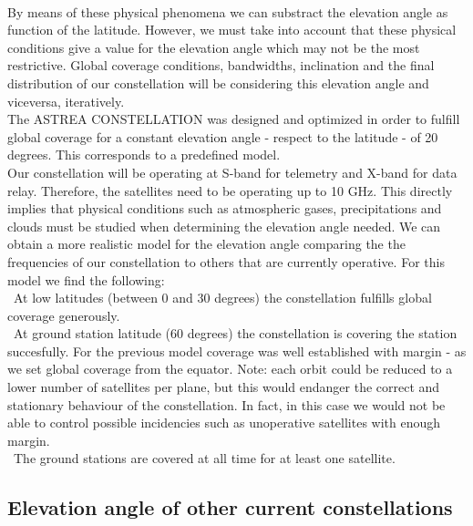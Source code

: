 \paragraph{}

By means of these physical phenomena we can substract the elevation angle as function of the latitude. However, we must take into account that these physical conditions give a value for the elevation angle which may not be the most restrictive. Global coverage conditions, bandwidths, inclination and the final distribution of our constellation will be considering this elevation angle and viceversa, iteratively. \\

The ASTREA CONSTELLATION was designed and optimized in order to fulfill global coverage for a constant elevation angle - respect to the latitude - of 20 degrees. This corresponds to a predefined model. \\

Our constellation will be operating at S-band for telemetry and X-band for data relay. Therefore, the satellites need to be operating up to 10 GHz. This directly implies that physical conditions such as atmospheric gases, precipitations and clouds must be studied when determining the elevation angle needed. We can obtain a more realistic model for the elevation angle comparing the the frequencies of our constellation to others that are currently operative. For this model we find the following:\\

\textendash\  At low latitudes (between 0 and 30 degrees) the constellation fulfills global coverage generously. \\

\textendash\ At ground station latitude (60 degrees) the constellation is covering the station succesfully. For the previous model coverage was well established with margin - as we set global coverage from the equator. Note: each orbit could be reduced to a lower number of satellites per plane, but this would endanger the correct and stationary behaviour of the constellation. In fact, in this case we would not be able to control possible incidencies such as unoperative satellites with enough margin. \\

\textendash\ The ground stations are covered at all time for at least one satellite.\\

\subsection{Elevation angle of other current constellations}

